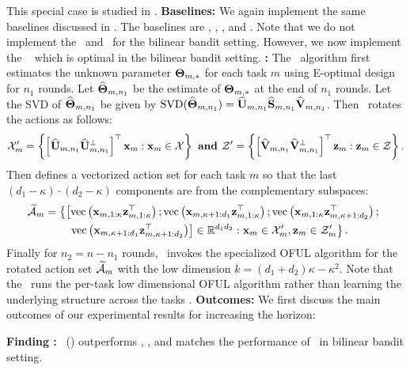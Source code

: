 \documentclass[10pt]{article}
\theoremstyle{plain}
\theoremstyle{definition}
\theoremstyle{remark}
\newcounter{findingcounter}
\newcommand{\customfinding}[1][\normalfont]{\stepcounter{findingcounter}\textbf{Finding \thefindingcounter:}#1 }
\begin{document}
This special case is studied in \citet{chaudhuri2017active}.
\textbf{Baselines:} We again implement the same baselines discussed in . The baselines are \pred, \predt, \dptg, and \ts.
Note that we do not implement the \linucb\ and \mlin\ for the bilinear bandit setting.
However, we now implement the \estr\ \citep{jun2019bilinear} which is optimal in the bilinear bandit setting.
\textbf{\estr:} The \estr\ algorithm first estimates the unknown parameter $\mathbf{\Theta}_{m,*}$ for each task $m$ using E-optimal design \citep{pukelsheim2006optimal, fedorov2013theory, jun2019bilinear} for $n_1$ rounds. Let $\widehat{\mathbf{\Theta}}_{m,n_1}$ be the estimate of $\mathbf{\Theta}_{m,*}$ at the end of $n_1$ rounds. Let the SVD of $\widehat{\mathbf{\Theta}}_{m,n_1}$ be given by $\operatorname{SVD}(\widehat{\mathbf{\Theta}}_{m,n_1}) = \widehat{\mathbf{U}}_{m,n_1}\widehat{\mathbf{S}}_{m, n_1}\widehat{\mathbf{V}}_{m, n_1}$.
Then \estr\ rotates the actions as follows:
\begin{align*}
    \mathcal{X}^{\prime}_m=\left\{\left[\widehat{\mathbf{U}}_{m,n_1} \widehat{\mathbf{U}}^{\perp}_{m,n_1}\right]^{\top} \mathbf{x}_m: \mathbf{x}_m \in \mathcal{X}\right\} \textbf{ and } \mathcal{Z}^{\prime}=\left\{\left[\widehat{\mathbf{V}}_{m,n_1} \widehat{\mathbf{V}}^{\perp}_{m,n_1}\right]^{\top} \mathbf{z}_m: \mathbf{z}_m \in \mathcal{Z}\right\}.
\end{align*}
Then defines a vectorized action set for each task $m$ so that the last $\left(d_1-\kappa\right) \cdot\left(d_2-\kappa\right)$ components are from the complementary subspaces:
\begin{align*}
\widetilde{\mathcal{A}}_m&=\left\{\left[\operatorname{vec}\left(\mathbf{x}_{m, 1: \kappa} \mathbf{z}_{m, 1: \kappa}^{\top}\right) ; \operatorname{vec}\left(\mathbf{x}_{m, \kappa+1: d_1} \mathbf{z}_{m, 1: \kappa}^{\top}\right) ; \operatorname{vec}\left(\mathbf{x}_{m, 1: \kappa} \mathbf{z}_{m, \kappa+1: d_2}^{\top}\right) ; \right.\right.\\
&\quad\quad\left.\left.\operatorname{vec}\left(\mathbf{x}_{m, \kappa+1: d_1} \mathbf{z}_{m, \kappa+1: d_2}^{\top}\right)\right] \in \mathbb{R}^{d_1 d_2}: \mathbf{x}_m \in \mathcal{X}^{\prime}_m, \mathbf{z}_m \in \mathcal{Z}^{\prime}_m\right\} .
\end{align*}
Finally for $n_2=n-n_1$ rounds, \estr\ invokes the specialized OFUL algorithm \citep{abbasi2011improved}  for the rotated action set $\widetilde{\mathcal{A}}_m$ with the low dimension $k=\left(d_1+d_2\right) \kappa-\kappa^2$.
Note that the \estr\ runs the per-task low dimensional OFUL algorithm rather than learning the underlying structure across the tasks \citep{mukherjee2023multi}.
\textbf{Outcomes:} We first discuss the main outcomes of our experimental results for increasing the horizon:
\begin{tcolorbox}
\customfinding \pred\ (\gt) outperforms \dptg, \ad, and matches the performance of \estr\ in bilinear bandit setting.
\end{tcolorbox}
\end{document}
